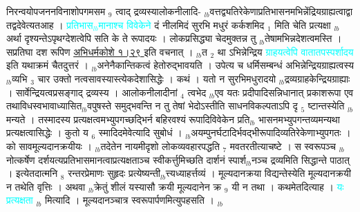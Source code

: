 \documentclass[article,12pt,a4paper]{memoir}%
\newcommand{\quotelemma}[1]{\textcolor{cyan}{#1}}
\newcounter{parCount}
\begin{document}
निरन्वयोपजननविनाशोपगमसम {\tiny $_{9}$} \leavevmode{} त्वाद् द्रव्यस्यालोकनीलादि- {\tiny $_{lb}$}वत्तद्व्यतिरेकेणाप्रतिभासनमभिन्नेंद्रियग्राह्यत्वाद्वा तद्वदेवेत्यतआह । \quotelemma{प्रतिभास{\tiny $_{lb}$}मानाश्च विवेकेने} \cite[3b1]{vn-msN} दं नीलमिदं सुरभि मधुरं कर्कशमिद {\tiny $_{1}$} मिति चेति प्रत्यक्षा {\tiny $_{lb}$}अर्था दृश्यन्तेऽपृथग्देशत्वेपि सति के ते रूपादयः । लोकप्रसिद्ध्या चेदमुक्तन्न तु {\tiny $_{lb}$}तेषामभिन्नदेशत्वमस्ति । सप्रतिघा दश रूपिण \href{http://sarit.indology.info/?cref=ak.1.29}{अभिधर्मकोशे १।२९ } इति वचनात् । {\tiny $_{lb}$}त {\tiny $_{2}$} था ऽभिन्नेन्द्रिय \quotelemma{ग्राहयत्वेपि वातातपस्पर्शादय} \cite[3ba]{vn-msN} इति यथाक्रमं चैतदुत्तरं । {\tiny $_{lb}$}अनेनैकान्तिकत्वं हेतोरुद्भावयति । उपेत्य च धर्मिसम्बन्धं अभिन्नेन्द्रियग्राह्यत्वस्य {\tiny $_{lb}$}व्यभि {\tiny $_{3}$} चार उक्तो नत्वसावस्यास्त्येकदेशासिद्धेः । कथं । यतो न सुरभिमधुरादयो {\tiny $_{lb}$}द्रव्यग्राहकेन्द्रियग्राह्याः । सार्वेन्द्रियत्वप्रसङ्गाद् द्रव्यस्य । आलोकनीलादीनां {\tiny $_{4}$} त्वभेद {\tiny $_{lb}$}एव यतः प्रदीपादिसन्निधानात् प्रकाशरूपा एव तथाविधस्वभावाध्यासित{\tiny $_{lb}$}वपुषस्ते समुद्भवन्ति न तु तेषां भेदोऽस्तीति साधनविकल्पताऽपि दृ {\tiny $_{5}$} ष्टान्तस्येति {\tiny $_{lb}$}मन्यते । तस्मादस्य प्रत्यक्षत्वमभ्युपगच्छद्भिर्न बहिरवश्यं रूपादिविवेकेन प्रति{\tiny $_{lb}$} \leavevmode{} भासनमभ्युपगन्तव्यमन्यथा प्रत्यक्षत्वासिद्धेः । कुतो य {\tiny $_{6}$} स्मादिदमेवेत्यादि सुबोधं । {\tiny $_{lb}$}अयम्पुनर्घटादिर्भवद्भीरूपादिव्यतिरेकेणाभ्युपगतः । को सावमूल्यदानक्रयीयः । {\tiny $_{lb}$}तदेतेन नायमीदृशो लोकव्यवहारपद्धति {\tiny $_{7}$} मवतरतीत्याचष्टे । स स्वरूपञ्च {\tiny $_{lb}$}नोत्कर्षेण दर्शयत्यप्रतिभासमानत्वाप्रत्यक्षताञ्च स्वीकर्त्तुमिच्छति दार्शनं स्पार्श{\tiny $_{lb}$}नञ्च द्रव्यमिति सिद्धान्ते पाठात् । इत्येतदात्मनि {\tiny $_{8}$} रन्तरप्रेमाणः सुहृदः प्रत्येष्यन्ती{\tiny $_{lb}$}त्त्यध्याहर्त्तव्यं । मूल्यदानक्रया विद्यन्तेस्येति मूल्यदानक्रयी न तथेति वृत्तिः । अथवा {\tiny $_{lb}$}क्रेतुं शीलं यस्यासौ क्रयी मूल्यदानेन क्र {\tiny $_{9}$} \leavevmode{} यी न तथा । कथमेतदित्याह । \quotelemma{यः प्रत्यक्षता} {\tiny $_{lb}$} \cite[3b2]{vn-msN} मित्यादि । मूल्यदानञ्चात्र स्वरूपार्पणमित्युपहसति ।
	{}
	\pend%
      {\tiny $_{lb}$}
\end{document}
